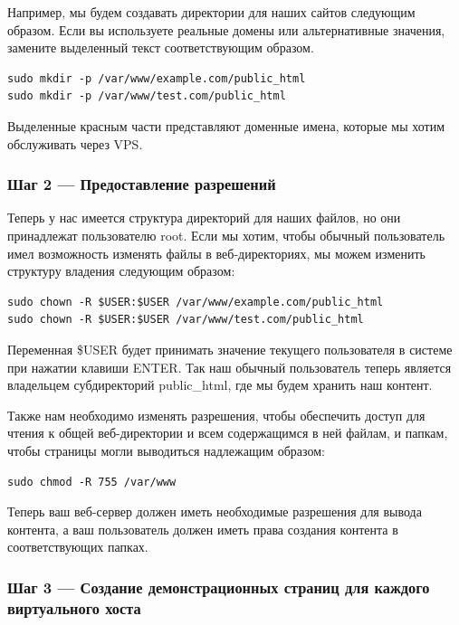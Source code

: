\documentclass[14pt, a4paper]{article}
\begin{document}
Например, мы будем создавать директории для наших сайтов следующим образом. Если вы используете 
реальные домены или альтернативные значения, замените выделенный текст соответствующим образом.

\begin{lstlisting}
sudo mkdir -p /var/www/example.com/public_html
sudo mkdir -p /var/www/test.com/public_html
\end{lstlisting}

Выделенные красным части представляют доменные имена, которые мы хотим обслуживать через VPS.

\subsubsection*{Шаг 2 — Предоставление разрешений}

Теперь у нас имеется структура директорий для наших файлов, но они принадлежат пользователю 
root. Если мы хотим, чтобы обычный пользователь имел возможность изменять файлы в веб-директориях, 
мы можем изменить структуру владения следующим образом:

\begin{lstlisting}
sudo chown -R $USER:$USER /var/www/example.com/public_html
sudo chown -R $USER:$USER /var/www/test.com/public_html
\end{lstlisting}

Переменная \$USER будет принимать значение текущего пользователя в системе при нажатии 
клавиши ENTER. Так наш обычный пользователь теперь является владельцем субдиректорий 
public\_html, где мы будем хранить наш контент.

Также нам необходимо изменять разрешения, чтобы обеспечить доступ для чтения к общей веб-директории 
и всем содержащимся в ней файлам, и папкам, чтобы страницы могли выводиться надлежащим образом:

\begin{lstlisting}
sudo chmod -R 755 /var/www
\end{lstlisting}

Теперь ваш веб-сервер должен иметь необходимые разрешения для вывода контента, а ваш пользователь 
должен иметь права создания контента в соответствующих папках.


\subsubsection*{Шаг 3 — Создание демонстрационных страниц для каждого виртуального хоста}
\end{document}
